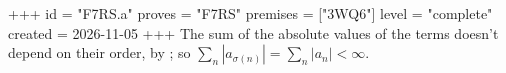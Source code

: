 +++
id = "F7RS.a"
proves = "F7RS"
premises = ["3WQ6"]
level = "complete"
created = 2026-11-05
+++
The sum of the absolute values of the terms doesn't depend on their order, by ; so $\sum_n |a_{\sigma(n)}| = \sum_n |a_n| < \infty$.
